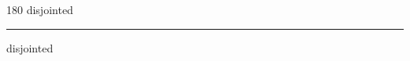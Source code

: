 
\begin{frame}
\begin{center}
\begin{turn}{180}
{\fontsize{2.5cm}{1em}\selectfont disjointed}
\end{turn}
\vspace{1em}\par  
\hrule
\vspace{1em}\par  
{\fontsize{2.5cm}{1em}\selectfont disjointed}
\end{center}
\end{frame}
